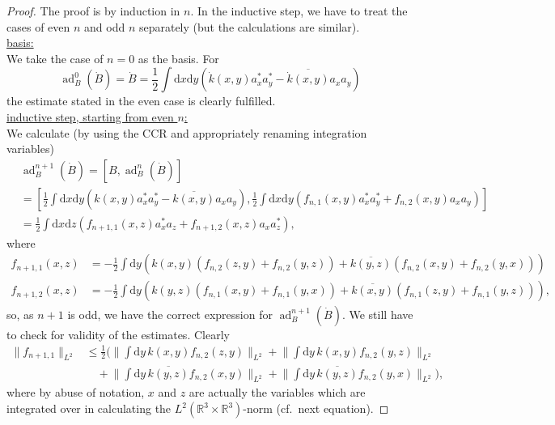 \documentclass[11pt,a4paper]{scrartcl}
\newcommand{\ad}{\operatorname{ad}}	%
\newcommand{\di}{\textrm{d}}		%
\newcommand{\cc}[1]{\overline{#1}}	%
\newcommand{\Rbb}{\mathbb{R}}		%
\newcommand{\norm}[1]{\lVert#1\rVert}	%
\newcommand{\be}[1]{\begin{equation}\label{eq:#1}}	%
\newcommand{\ee}{\end{equation}}
\newcommand{\bd}{\begin{displaymath}}			%
\newcommand{\ed}{\end{displaymath}}
\begin{document}
\begin{proof} The proof is by induction in $n$. In the inductive step, we have to treat the cases of even $n$ and odd $n$ separately (but the calculations are similar).\\
\underline{basis:}\\
We take the case of $n=0$ as the basis. For
\bd
\ad^0_B(\dot B) = \dot B = \frac{1}{2}\int \di x\di y\left( \dot k(x,y) a^\ast_x a^\ast_y - \cc{\dot k(x,y)} a_x a_y \right)
\ed
the estimate stated in the even case is clearly fulfilled.\\
\underline{inductive step, starting from even $n$:}\\
We calculate (by using the CCR and appropriately renaming integration variables)
\begin{align*}
& \ad^{n+1}_B(\dot B) = [B,\ad^n_B(\dot B)] \\
& = \left[\frac{1}{2} \int \di x\di y\left( k(x,y)a^\ast_x a^\ast_y - \cc{k(x,y)}a_x a_y \right), \frac{1}{2}\int \di x\di y\left( f_{n,1}(x,y) a^\ast_x a^\ast_y + f_{n,2}(x,y) a_x a_y \right)\right] \\
& = \frac{1}{2} \int \di x\di z \left(f_{n+1,1}(x,z) a^\ast_x a_z + f_{n+1,2}(x,z) a_x a^\ast_z \right),
\end{align*}
where
\begin{equation}
\label{eq:even}
\begin{split}
f_{n+1,1}(x,z) & = -\frac{1}{2} \int \di y \left( k(x,y) \left( f_{n,2}(z,y) + f_{n,2}(y,z) \right) + \cc{k(y,z)}\left( f_{n,2}(x,y) + f_{n,2}(y,x)\right) \right)\\
f_{n+1,2}(x,z) & = -\frac{1}{2} \int \di y \left( k(y,z) \left( f_{n,1}(x,y) + f_{n,1}(y,x) \right) + \cc{k(x,y)}\left( f_{n,1}(z,y) + f_{n,1}(y,z)\right) \right), 
\end{split}
\end{equation}
so, as $n+1$ is odd, we have the correct expression for $\ad^{n+1}_B(\dot B)$. We still have to check for validity of the estimates.
Clearly
\be{normnorm}
\begin{split}
\norm{f_{n+1,1}}_{L^2} & \leq \frac{1}{2} \bigg( \norm{\int \di y\, k(x,y) f_{n,2}(z,y)}_{L^2} + \norm{\int \di y\, k(x,y) f_{n,2}(y,z)}_{L^2} \\
& \quad + \norm{\int \di y\, \cc{k(y,z)}f_{n,2}(x,y)}_{L^2} + \norm{\int \di y\, \cc{k(y,z)} f_{n,2}(y,x)}_{L^2} \bigg),
\end{split}
\ee
where by abuse of notation, $x$ and $z$ are actually the variables which are integrated over in calculating the $L^2(\Rbb^3\times \Rbb^3)$-norm (cf.\ next equation).

\end{proof}
\end{document}

